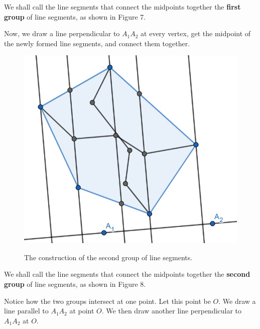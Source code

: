 \documentclass[12pt]{scrartcl}
\begin{document}
We shall call the line segments that connect the midpoints together the \textbf{first group} of line segments, as shown in Figure 7.

\pagebreak

Now, we draw a line perpendicular to $A_{1}A_{2}$ at every vertex, get the midpoint of the newly formed line segments, and connect them together.

\begin{figure}[htpb]
	\centering
	\includegraphics[scale=.75]{images/rq3_1_3.jpg}
	\label{fig:rq3_1_3_img}
	\caption{The construction of the second group of line segments.}
\end{figure}

We shall call the line segments that connect the midpoints together the \textbf{second group} of line segments, as shown in Figure 8.

\pagebreak

Notice how the two groups intersect at one point. Let this point be $O$. We draw a line parallel to $A_{1}A_{2}$ at point $O$.
We then draw another line perpendicular to $A_{1}A_{2}$ at $O$.
\end{document}
